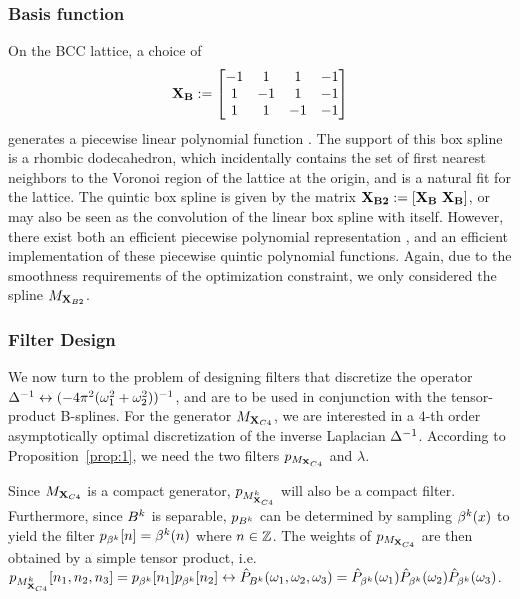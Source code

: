\subsubsection{Basis function}
On the BCC lattice, a choice of {\footnotesize
\begin{equation*}
	\mathbf{\mathbf{X}_{B}} := 
	\begin{bmatrix} 
		-1 & 1 & 1 & -1 \\
		1 & -1 & 1 & -1 \\
		1 & 1 & -1 & -1 
	\end{bmatrix}
\end{equation*}}
generates a piecewise linear polynomial function \cite{practicalbox}. 
The support of this box spline is a rhombic dodecahedron, which incidentally contains the set of first nearest neighbors to the Voronoi region of the lattice at the origin, and is a natural fit for the lattice. 
The quintic box spline is given by the matrix $\mathbf{\mathbf{X}_{B2}} := \left[\mathbf{\mathbf{X}_{B}} \ \mathbf{\mathbf{X}_{B}}\right]$, or may also be seen as the convolution of the linear box spline with itself. 
However, there exist both an efficient piecewise polynomial representation \cite{practicalbox}, and an efficient implementation \cite{fastbox} of these piecewise quintic polynomial functions. 
Again, due to the smoothness requirements of the optimization constraint, we only considered the spline $M_{\mathbf{X}_{B2}}$.

\subsubsection{Filter Design}
\label{sec:poissonFilterDesign}

We now turn to the problem of designing filters that discretize the operator $\mathop{\Delta^{-1}} \leftrightarrow (-4\pi^2(\omega_1^2 +\omega_2^2))^{-1}$, and are to be used in conjunction with the tensor-product B-splines. 
For the generator $M_{\mathbf{X}_{C4}}$, we are interested in a $4$-th order asymptotically optimal discretization of the inverse Laplacian $\mathop{\Delta^{-1}}$. 
According to Proposition~\ref{prop:1}, we need the two filters $p_{M_{\mathbf{X}_{C4}}}$ and $\lambda$.

Since $M_{\mathbf{X}_{C4}}$ is a compact generator, $p_{M_{\mathbf{X}_{C4}}^k}$ will also be a compact filter. 
Furthermore, since $B^k$ is separable, $p_{B^k}$ can be determined by sampling $\beta^k(x)$ to yield the filter $p_{\beta^k}[n] = \beta^k(n)$ where $n \in \mathbb{Z}$. 
The weights of $p_{M_{\mathbf{X}_{C4}}}$ are then obtained by a simple tensor product, i.e. $p_{M_{\mathbf{X}_{C4}}^k}[n_1,n_2,n_3] = p_{\beta^k}[n_1]p_{\beta^k}[n_2] \leftrightarrow \hat{P}_{B^k}(\omega_1,\omega_2,\omega_3) = \hat{P}_{\beta^k}(\omega_1)\hat{P}_{\beta^k}(\omega_2)\hat{P}_{\beta^k}(\omega_3)$.

